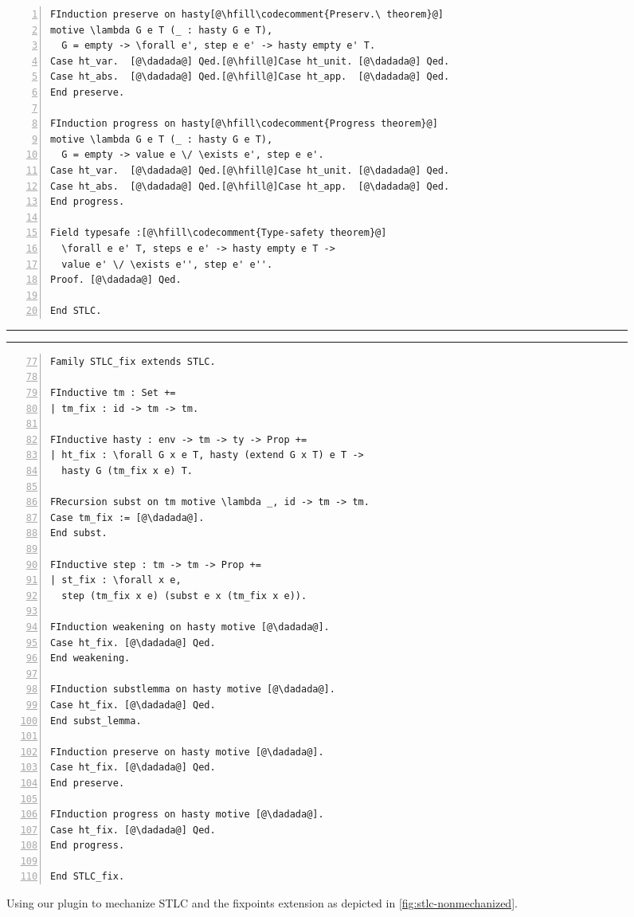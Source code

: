 \begin{figure}
\begin{minipage}{\textwidth}
\begin{multicols}{2}
\begin{lstlisting}[numbers=left]
FInduction preserve on hasty[@\hfill\codecomment{Preserv.\ theorem}@]
motive \lambda G e T (_ : hasty G e T),
  G = empty -> \forall e', step e e' -> hasty empty e' T.
Case ht_var.  [@\dadada@] Qed.[@\hfill@]Case ht_unit. [@\dadada@] Qed.
Case ht_abs.  [@\dadada@] Qed.[@\hfill@]Case ht_app.  [@\dadada@] Qed.
End preserve.

FInduction progress on hasty[@\hfill\codecomment{Progress theorem}@]
motive \lambda G e T (_ : hasty G e T),
  G = empty -> value e \/ \exists e', step e e'.
Case ht_var.  [@\dadada@] Qed.[@\hfill@]Case ht_unit. [@\dadada@] Qed.
Case ht_abs.  [@\dadada@] Qed.[@\hfill@]Case ht_app.  [@\dadada@] Qed.
End progress.

Field typesafe :[@\hfill\codecomment{Type-safety theorem}@]
  \forall e e' T, steps e e' -> hasty empty e T ->
  value e' \/ \exists e'', step e' e''.
Proof. [@\dadada@] Qed.

End STLC.
\end{lstlisting}
\medskip

\hrule
\hrule
\medskip

\begin{lstlisting}[numbers=left,firstnumber=77]
Family STLC_fix extends STLC.

FInductive tm : Set +=
| tm_fix : id -> tm -> tm.

FInductive hasty : env -> tm -> ty -> Prop +=
| ht_fix : \forall G x e T, hasty (extend G x T) e T ->
  hasty G (tm_fix x e) T.

FRecursion subst on tm motive \lambda _, id -> tm -> tm.
Case tm_fix := [@\dadada@].
End subst.

FInductive step : tm -> tm -> Prop +=
| st_fix : \forall x e,
  step (tm_fix x e) (subst e x (tm_fix x e)).

FInduction weakening on hasty motive [@\dadada@].
Case ht_fix. [@\dadada@] Qed.
End weakening.

FInduction substlemma on hasty motive [@\dadada@].
Case ht_fix. [@\dadada@] Qed.
End subst_lemma.

FInduction preserve on hasty motive [@\dadada@].
Case ht_fix. [@\dadada@] Qed.
End preserve.

FInduction progress on hasty motive [@\dadada@].
Case ht_fix. [@\dadada@] Qed.
End progress.

End STLC_fix.
\end{lstlisting}

\end{multicols}
\end{minipage}
\caption{Using our plugin to mechanize STLC and the fixpoints extension
as depicted in \cref{fig:stlc-nonmechanized}.}
\label{fig:stlc-mechanized}
\end{figure}




